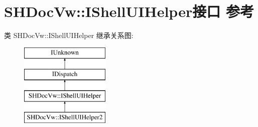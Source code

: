 \hypertarget{interface_s_h_doc_vw_1_1_i_shell_u_i_helper}{}\section{S\+H\+Doc\+Vw\+:\+:I\+Shell\+U\+I\+Helper接口 参考}
\label{interface_s_h_doc_vw_1_1_i_shell_u_i_helper}
类 S\+H\+Doc\+Vw\+:\+:I\+Shell\+U\+I\+Helper 继承关系图\+:\begin{figure}[H]
\begin{center}
\leavevmode
\includegraphics[height=4.000000cm]{interface_s_h_doc_vw_1_1_i_shell_u_i_helper}
\end{center}
\end{figure}
